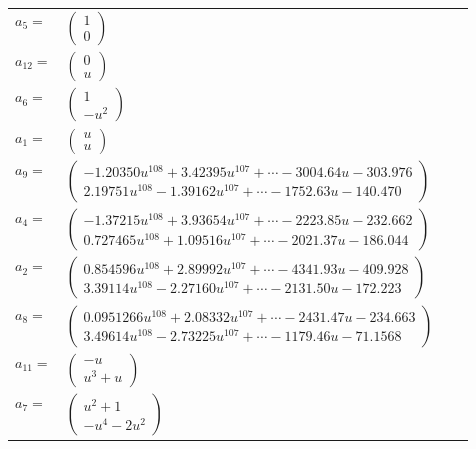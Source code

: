 \documentclass[1p]{elsarticle_modified}
\theoremstyle{definition}
\begin{document}
\begin{tabular}{m{7pt} m{180pt} m{7pt} m{180pt} }
\flushright $a_{5}=$&$\begin{pmatrix}1\\0\end{pmatrix}$ \\
\flushright $a_{12}=$&$\begin{pmatrix}0\\u\end{pmatrix}$ \\
\flushright $a_{6}=$&$\begin{pmatrix}1\\- u^2\end{pmatrix}$ \\
\flushright $a_{1}=$&$\begin{pmatrix}u\\u\end{pmatrix}$ \\
\flushright $a_{9}=$&$\begin{pmatrix}-1.20350 u^{108}+3.42395 u^{107}+\cdots-3004.64 u-303.976\\2.19751 u^{108}-1.39162 u^{107}+\cdots-1752.63 u-140.470\end{pmatrix}$ \\
\flushright $a_{4}=$&$\begin{pmatrix}-1.37215 u^{108}+3.93654 u^{107}+\cdots-2223.85 u-232.662\\0.727465 u^{108}+1.09516 u^{107}+\cdots-2021.37 u-186.044\end{pmatrix}$ \\
\flushright $a_{2}=$&$\begin{pmatrix}0.854596 u^{108}+2.89992 u^{107}+\cdots-4341.93 u-409.928\\3.39114 u^{108}-2.27160 u^{107}+\cdots-2131.50 u-172.223\end{pmatrix}$ \\
\flushright $a_{8}=$&$\begin{pmatrix}0.0951266 u^{108}+2.08332 u^{107}+\cdots-2431.47 u-234.663\\3.49614 u^{108}-2.73225 u^{107}+\cdots-1179.46 u-71.1568\end{pmatrix}$ \\
\flushright $a_{11}=$&$\begin{pmatrix}- u\\u^3+u\end{pmatrix}$ \\
\flushright $a_{7}=$&$\begin{pmatrix}u^2+1\\- u^4-2 u^2\end{pmatrix}$ \\

\end{tabular}
\end{document}

